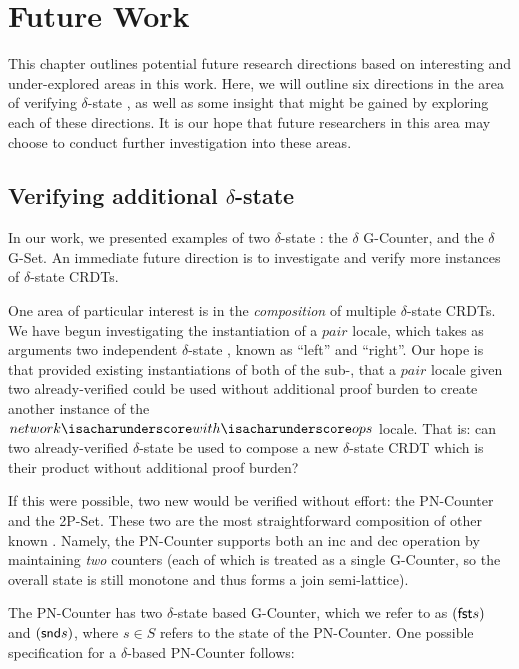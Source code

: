 \chapter{Future Work}
\label{chap:future-work}

This chapter outlines potential future research directions based on interesting
and under-explored areas in this work. Here, we will outline six directions in
the area of verifying $\delta$-state \CRDTs, as well as some insight that might
be gained by exploring each of these directions. It is our hope that future
researchers in this area may choose to conduct further investigation into these
areas.

\section{Verifying additional $\delta$-state \CRDTs}
\label{sec:future-pair-locale}
In our work, we presented examples of two $\delta$-state \CRDTs: the $\delta$
G-Counter, and the $\delta$ G-Set. An immediate future direction is to
investigate and verify more instances of $\delta$-state CRDTs.

One area of particular interest is in the \emph{composition} of multiple
$\delta$-state CRDTs. We have begun investigating the instantiation of a $pair$
locale, which takes as arguments two independent $\delta$-state \CRDTs, known as
``left'' and ``right''. Our hope is that provided existing instantiations of
both of the sub-\CRDTs, that a $pair$ locale given two already-verified \CRDTs
could be used without additional proof burden to create another instance of the
$network{\isacharunderscore}with{\isacharunderscore}ops$ locale. That is: can
two already-verified $\delta$-state \CRDTs be used to compose a new
$\delta$-state CRDT which is their product without additional proof burden?

If this were possible, two new \CRDTs would be verified without effort: the
PN-Counter and the 2P-Set. These two \CRDTs are the most straightforward
composition of other known \CRDTs. Namely, the PN-Counter supports both an
\textsf{inc} and \textsf{dec} operation by maintaining \emph{two} counters (each
of which is treated as a single G-Counter, so the overall state is still
monotone and thus forms a join semi-lattice).

The PN-Counter has two $\delta$-state based G-Counter, which we refer to as
$(\textsf{fst} s)$ and $(\textsf{snd} s)$, where $s \in S$ refers to the state of the
PN-Counter. One possible specification for a $\delta$-based PN-Counter follows:

